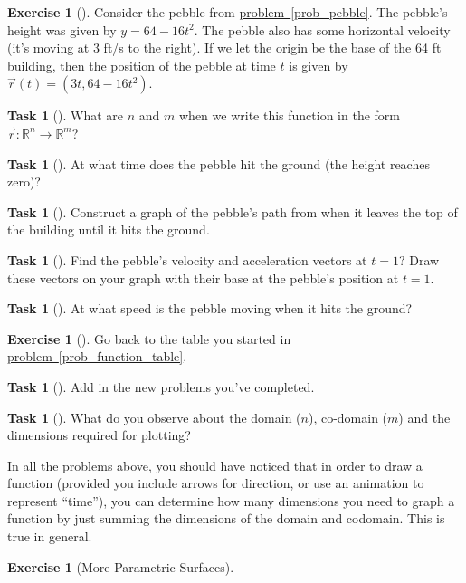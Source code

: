 \documentclass[10pt,]{book}
\theoremstyle{plain}
\theoremstyle{definition}
\theoremstyle{definition}
\theoremstyle{definition}
\theoremstyle{definition}
\newtheorem{exploration}[project]{Exercise}
\newtheorem{task}[project]{Task}
\theoremstyle{definition}
\numberwithin{equation}{section}
\begin{document}
\begin{exploration}[]\label{exploration-108}
Consider the pebble from \hyperref[prob_pebble]{problem~\ref{prob_pebble}}. The pebble's height was given by \(y=64-16t^2\). The pebble also has some horizontal velocity (it's moving at 3 ft/s to the right). If we let the origin be the base of the 64 ft building, then the position of the pebble at time \(t\) is given by \(\vec r(t) = (3t, 64-16t^2)\).%
\begin{task}[]\label{task-196}
What are \(n\) and \(m\) when we write this function in the form  \(\vec r\colon {\mathbb{R}}^n\to {\mathbb{R}}^m\)?%
\end{task}
\begin{task}[]\label{task-197}
At what time does the pebble hit the ground (the height reaches zero)?%
\end{task}
\begin{task}[]\label{task-198}
Construct a graph of the pebble's path from when it leaves the top of the building until it hits the ground.%
\end{task}
\begin{task}[]\label{task-199}
Find the pebble's velocity and acceleration vectors at \(t=1\)? Draw these vectors on your graph with their base at the pebble's position at \(t=1\).%
\end{task}
\begin{task}[]\label{task-200}
At what speed is the pebble moving when it hits the ground?%
\end{task}
\end{exploration}
\begin{exploration}[]\label{exploration-109}
Go back to the table you started in \hyperref[prob_function_table]{problem~\ref{prob_function_table}}.%
\begin{task}[]\label{task-201}
Add in the new problems you've completed.%
\end{task}
\begin{task}[]\label{task-202}
What do you observe about the domain (\(n\)), co-domain (\(m\)) and the dimensions required for plotting?%
\end{task}
\end{exploration}
In all the problems above, you should have noticed that in order to draw a function (provided you include arrows for direction, or use an animation to represent ``time''), you can determine how many dimensions you need to graph a function by just summing the dimensions of the domain and codomain. This is true in general.%
\begin{exploration}[More Parametric Surfaces]\label{second_parametric_surface_example}
\end{exploration}
\typeout{************************************************}
\typeout{************************************************}
\end{document}
